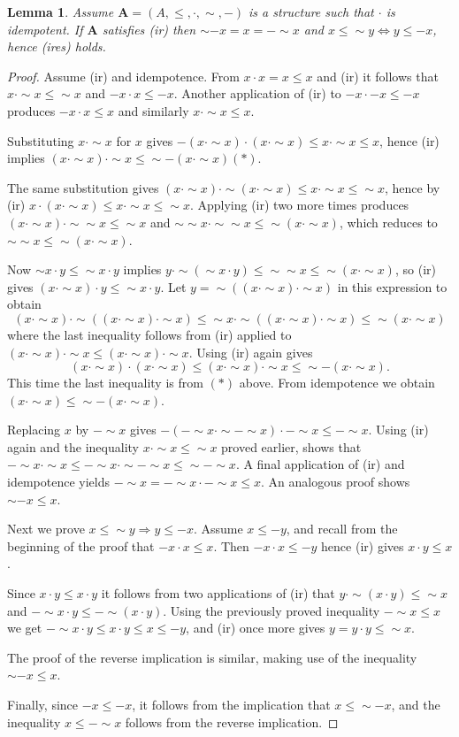 \documentclass[12pt]{amsart}
\newtheorem{lemma}[theorem]{Lemma}
\newcommand{\m}{\mathbf} %
\renewcommand{\ln}{{\sim}}
\newcommand{\rn}{{-}}
\begin{document}
\begin{lemma}\label{idem}
Assume $\m A=(A,\le,\cdot,\ln,\rn)$ is a structure such that $\cdot$ is idempotent. If $\m A$ satisfies \textup{(ir)} then $\ln\rn x=x=\rn\ln x$ and $x\le \ln y\iff y\le\rn x$, hence \textup{(ires)} holds.
\end{lemma}
\begin{proof} Assume (ir) and idempotence. From $x\cdot x=x\le x$ and (ir) it follows that $x\cdot \ln x\le \ln x$ and $-x\cdot x\le -x$. 
Another application of (ir) to $\rn x\cdot\rn x\le \rn x$ produces $-x\cdot x\le x$ and similarly $x\cdot \ln x\le x$.

Substituting $x\cdot\ln x$ for $x$ gives $-(x\cdot\ln x)\cdot(x\cdot\ln x)\le x\cdot\ln x\le x$, hence (ir) implies $(x\cdot\ln x)\cdot\ln x\le \ln\rn(x\cdot\ln x)$\quad$(*)$.

The same substitution gives $(x\cdot\ln x)\cdot\ln(x\cdot\ln x)\le x\cdot\ln x\le \ln x$, hence by (ir) $x\cdot(x\cdot\ln x)\le x\cdot\ln x\le \ln x$. Applying (ir) two more times produces $(x\cdot\ln x)\cdot\ln\ln x\le \ln x$ and $\ln\ln x\cdot\ln\ln x\le \ln(x\cdot\ln x)$, which reduces to $\ln\ln x\le\ln (x\cdot\ln x)$.

Now $\ln x\cdot y\le\ln x\cdot y$ implies $y\cdot\ln(\ln x\cdot y)\le\ln\ln x\le\ln(x\cdot\ln x)$, so (ir) gives $(x\cdot\ln x)\cdot y\le\ln x\cdot y$.
Let $y=\ln((x\cdot\ln x)\cdot\ln x)$ in this expression to obtain
$$
(x\cdot\ln x)\cdot\ln((x\cdot\ln x)\cdot\ln x)\le\ln x\cdot\ln((x\cdot\ln x)\cdot\ln x)\le\ln(x\cdot\ln x)
$$
where the last inequality follows from (ir) applied to $(x\cdot\ln x)\cdot\ln x\le(x\cdot\ln x)\cdot\ln x$. Using (ir) again gives
$$
(x\cdot\ln x)\cdot(x\cdot\ln x)\le(x\cdot\ln x)\cdot\ln x\le\ln\rn(x\cdot\ln x).
$$
This time the last inequality is from $(*)$ above. From idempotence we obtain
$(x\cdot\ln x)\le\ln\rn(x\cdot\ln x)$.

Replacing $x$ by $\rn\ln x$ gives $\rn(\rn\ln x\cdot\ln\rn\ln x)\cdot\rn\ln x\le \rn\ln x$. Using (ir) again and the inequality $x\cdot\ln x\le\ln x$ proved earlier, shows that $\rn\ln x\cdot\ln x\le\rn\ln x\cdot\ln\rn\ln x\le \ln\rn\ln x$. A final application of (ir) and idempotence yields $\rn\ln x=\rn\ln x\cdot\rn\ln x\le x$.
An analogous proof shows $\ln\rn x\le x$. 

Next we prove $x\le\ln y\Rightarrow y\le\rn x$.
Assume $x\le\rn y$, and recall from the beginning of the proof that $\rn x\cdot x\le x$. Then $\rn x\cdot x\le\rn y$ hence (ir) gives $x\cdot y\le x$.

Since $x\cdot y\le x\cdot y$ it follows from two applications of (ir) that $y\cdot\ln(x\cdot y)\le\ln x$ and $\rn\ln x\cdot y\le \rn\ln(x\cdot y)$. Using the previously proved inequality $\rn\ln x\le x$ we get $\rn\ln x\cdot y\le x\cdot y\le x\le \rn y$, and (ir) once more gives $y=y\cdot y\le \ln x$. 

The proof of the reverse implication is similar, making use of the inequality $\ln\rn x\le x$.

Finally, since $\rn x\le \rn x$, it follows from the implication that $x\le \ln\rn x$, and the inequality $x\le\rn\ln x$ follows from the reverse implication.
\end{proof}
\end{document}
